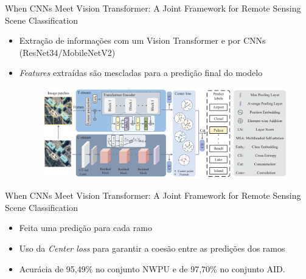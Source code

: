 
\begin{frame}{When CNNs Meet Vision Transformer: A Joint Framework for Remote Sensing Scene Classification}
    \begin{itemize}
        \item Extração de informações com um Vision Transformer e por CNNs (ResNet34/MobileNetV2)

        \item \textit{Features} extraídas são mescladas para a predição final do modelo

        \begin{figure}
            \centering
            \includegraphics [width=0.75\linewidth]{TrabalhosRelacionados/when_cnns_meet_vision_transformer.png}
        \end{figure}
        
    \end{itemize}
\end{frame}

\begin{frame}{When CNNs Meet Vision Transformer: A Joint Framework for Remote Sensing Scene Classification}
    \begin{itemize}
        \item Feita uma predição para cada ramo

        \item Uso da \textit{Center loss} para garantir a coesão entre as predições dos ramos

        \item Acurácia de 95,49\% no conjunto NWPU e de 97,70\% no conjunto AID.
        
    \end{itemize}
\end{frame}


